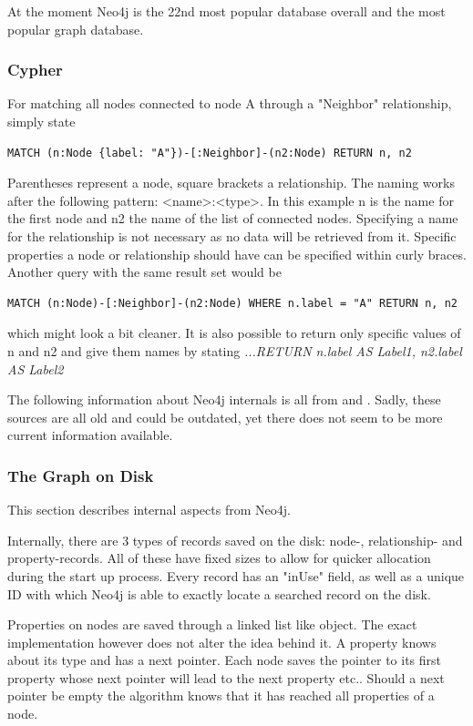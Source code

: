 At the moment Neo4j is the 22nd most popular database overall \cite{DbEnginesGeneral} and the most popular graph database. \cite{DbEnginesGraph}

\subsubsection{Cypher}
For matching all nodes connected to node A through a "Neighbor" relationship, simply state
\lstset{language=Cypher}
\begin{lstlisting}[label={ex231},caption={Matching Nodes Way 1}]
MATCH (n:Node {label: "A"})-[:Neighbor]-(n2:Node) RETURN n, n2
\end{lstlisting}
Parentheses represent a node, square brackets a relationship. The naming works after the following pattern: <name>:<type>. In this example n is the name for the first node and n2 the name of the list of connected nodes. Specifying a name for the relationship is not necessary as no data will be retrieved from it. Specific properties a node or relationship should have can be specified within curly braces. Another query with the same result set would be
\begin{lstlisting}[label={ex232},caption={Matching Nodes Way 2}]
MATCH (n:Node)-[:Neighbor]-(n2:Node) WHERE n.label = "A" RETURN n, n2
\end{lstlisting}
which might look a bit cleaner. It is also possible to return only specific values of n and n2 and give them names by stating
\emph{ ...RETURN n.label AS Label1, n2.label AS Label2 }

The following information about Neo4j internals is all from \cite{NeoInternals} and \cite{Neo4jInternalsPP}. Sadly, these sources are all old and could be outdated, yet there does not seem to be more current information available.

\subsubsection{The Graph on Disk}
This section describes internal aspects from Neo4j.

Internally, there are 3 types of records saved on the disk: node-, relationship- and property-records. All of these have fixed sizes to allow for quicker allocation during the start up process. Every record has an "inUse" field, as well as a unique ID with which Neo4j is able to exactly locate a searched record on the disk. \citep[minute 08]{NeoInternals}

Properties on nodes are saved through a linked list like object. The exact implementation however does not alter the idea behind it. A property knows about its type and has a next pointer. Each node saves the pointer to its first property whose next pointer will lead to the next property etc.. Should a next pointer be empty the algorithm knows that it has reached all properties of a node.\cite{NeoInternals}

